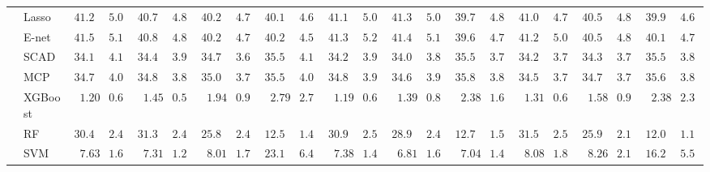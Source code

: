 \begin{tabular}{ll|ll|llllll|llllll|llllll}
 & Lasso  & $41.22$ & $5.00$ & $40.72$ & $4.83$ & $40.25$ & $4.71$ & $40.19$ & $4.63$ & $41.19$ & $5.05$ & $41.30$ & $5.04$ & $39.70$ & $4.84$ & $41.01$ & $4.79$ & $40.54$ & $4.81$ & $39.99$ & $4.61$ \\
 & E-net  & $41.58$ & $5.16$ & $40.88$ & $4.83$ & $40.26$ & $4.75$ & $40.23$ & $4.53$ & $41.39$ & $5.28$ & $41.48$ & $5.17$ & $39.62$ & $4.78$ & $41.29$ & $5.01$ & $40.52$ & $4.82$ & $40.18$ & $4.77$ \\
 & SCAD  & $34.19$ & $4.18$ & $34.41$ & $3.91$ & $34.73$ & $3.66$ & $35.58$ & $4.12$ & $34.29$ & $3.91$ & $34.03$ & $3.84$ & $35.58$ & $3.79$ & $34.20$ & $3.70$ & $34.30$ & $3.74$ & $35.55$ & $3.83$ \\
 & MCP  & $34.77$ & $4.05$ & $34.83$ & $3.87$ & $35.02$ & $3.77$ & $35.54$ & $4.09$ & $34.80$ & $3.90$ & $34.60$ & $3.95$ & $35.88$ & $3.87$ & $34.55$ & $3.71$ & $34.70$ & $3.78$ & $35.62$ & $3.88$ \\
 & XGBoost  & $\phantom{0}1.20$ & $0.62$ & $\phantom{0}1.45$ & $0.58$ & $\phantom{0}1.94$ & $0.93$ & $\phantom{0}2.79$ & $2.75$ & $\phantom{0}1.19$ & $0.63$ & $\phantom{0}1.39$ & $0.81$ & $\phantom{0}2.38$ & $1.67$ & $\phantom{0}1.31$ & $0.68$ & $\phantom{0}1.58$ & $0.93$ & $\phantom{0}2.38$ & $2.31$ \\
 & RF  & $30.43$ & $2.48$ & $31.36$ & $2.45$ & $25.82$ & $2.40$ & $12.51$ & $1.40$ & $30.99$ & $2.50$ & $28.96$ & $2.45$ & $12.74$ & $1.55$ & $31.58$ & $2.59$ & $25.90$ & $2.14$ & $12.03$ & $1.13$ \\
 & SVM  & $\phantom{0}7.63$ & $1.64$ & $\phantom{0}7.31$ & $1.26$ & $\phantom{0}8.01$ & $1.73$ & $23.11$ & $6.48$ & $\phantom{0}7.38$ & $1.43$ & $\phantom{0}6.81$ & $1.61$ & $\phantom{0}7.04$ & $1.42$ & $\phantom{0}8.08$ & $1.85$ & $\phantom{0}8.26$ & $2.11$ & $16.28$ & $5.51$ \\
\hline 
\end{tabular}

